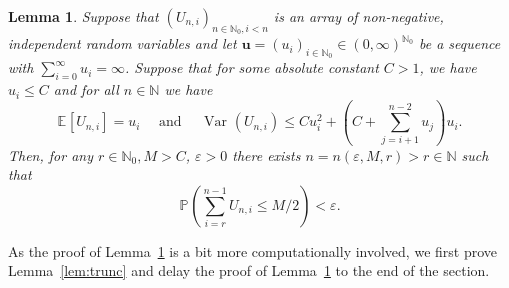 \documentclass[12pt]{article}
\newtheorem{lem}[thm]{Lemma}
\theoremstyle{definition}
\newcommand{\E}[2][]{\ensuremath{\mathbb{E}_{#1}\left[#2 \right]}}
\newcommand{\Prob}[2][]{\ensuremath{\mathbb{P}_{#1} \left(#2 \right)}}
\newcommand{\Var}[2][]{\operatorname{Var}_{#1}\left(#2\right)}
\newcommand{\eps}{\varepsilon}
\begin{document}
\begin{lem} \label{lem:summands-diverge}
    Suppose that $(U_{n,i})_{n\in \mathbb{N}_0, i < n}$ is an array of non-negative, independent random variables and let $\boldsymbol{u} = (u_{i})_{i \in \mathbb{N}_0} \in (0, \infty)^{\mathbb{N}_0}$ be a sequence with $\sum_{i=0}^{\infty} u_i = \infty$. Suppose that for some absolute constant $C > 1$, we have $u_{i} \leq C$ and for all $n \in \mathbb{N}$ we have
    \begin{equation} \label{eq:variance-mean-bound}
        \E{U_{n,i}} = u_i \quad \text{ and } \quad \Var{U_{n,i}} \leq Cu_{i}^2 +  \left(C + \sum_{j=i+1}^{n-2} u_{j}\right)u_{i}. 
    \end{equation}
    Then, for any $r \in \mathbb{N}_0, M > C$, $\eps > 0$ there exists $n =  n(\eps, M, r) > r \in \mathbb{N}$ such that 
    \begin{equation} \label{eq:large-prob-to-be-large}
    \Prob{\sum_{i=r}^{n-1} U_{n,i} \leq M/2} < \eps. 
    \end{equation}
\end{lem}
As the proof of Lemma~\ref{lem:summands-diverge} is a bit more computationally involved, we first prove Lemma~\ref{lem:trunc} and delay the proof of Lemma~\ref{lem:summands-diverge} to the end of the section. 
\end{document}
